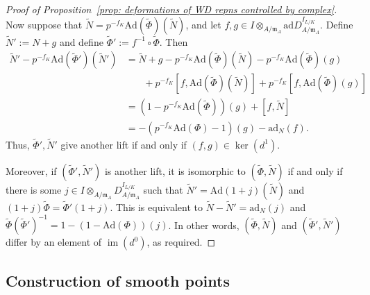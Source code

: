 \documentclass{amsart}
\def\Ad{\mathrm{Ad}}
\DeclareMathOperator{\Lie}{Lie}
\def\ad{\mathrm{ad}}
\newtheorem{lemma}[subsubsection]{Lemma}
\theoremstyle{definition}
\theoremstyle{remark}
\newcommand{\mar}[1]{}
\newcommand{\mar}[1]{\marginpar{\raggedright\tiny squirrel #1}}
\DeclareMathOperator{\Aut}{Aut}
\DeclareMathOperator{\im}{im}
\begin{document}
\begin{proof}[Proof of Proposition~\ref{prop: deformations of WD repns controlled by complex}]
Now suppose that $\widetilde N=p^{-f_K}\Ad(\widetilde\Phi)(\widetilde N)$, and let $f,g\in I\otimes_{A/\mathfrak{m}_A}\ad D_{A/\mathfrak{m}_A}^{I_{L/K}}$.  Define $\widetilde{N}':=N+g$ and define $\widetilde{\Phi}':=f^{-1}\circ\widetilde\Phi$.  Then 
\begin{align*}
\widetilde{N}'-p^{-f_K}\Ad(\widetilde{\Phi}')(\widetilde{N}')&=\widetilde N+g-p^{-f_K} \Ad(\widetilde\Phi)(\widetilde N)-p^{-f_K}\Ad(\widetilde\Phi)(g)\\&\phantom{{}=1}+p^{-f_K}[f,\Ad(\widetilde\Phi)(\widetilde N)]+p^{-f_K}[f,\Ad(\widetilde\Phi)(g)]	\\
&=(1-p^{-f_K}\Ad(\widetilde\Phi))(g)+[f,\widetilde N]\\
&=-(p^{-f_K}\Ad(\Phi)-1)(g)-\ad_N(f).
\end{align*}
Thus, $\widetilde\Phi',\widetilde N'$ give another lift if and only if $(f,g)\in\ker(d^1)$.

Moreover, if $(\widetilde\Phi',\widetilde N')$ is another lift, it is
isomorphic to $(\widetilde\Phi,\widetilde N)$ if and only if there is
some $j\in I\otimes_{A/\mathfrak{m}_A}D_{A/\mathfrak{m}_A}^{I_{L/K}}$
such that $\widetilde N'=\Ad(1+j)(\widetilde N)$ and
$(1+j)\widetilde\Phi=\widetilde\Phi'(1+j)$.  This is equivalent to
$\widetilde N-\widetilde N'=\ad_N(j)$ and
$\widetilde\Phi(\widetilde\Phi')^{-1}=1-(1-\Ad(\Phi))(j)$.  In other
words, $(\widetilde\Phi,\widetilde N)$ and
$(\widetilde\Phi',\widetilde N')$ differ by an element of $\im(d^0)$,
as required.
\end{proof}


\subsection{Construction of smooth points}\label{subsec: very
  smooth points}

\end{document}
